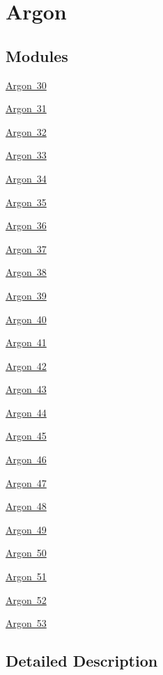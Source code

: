 \hypertarget{group___isotope_const-_argon}{}\section{Argon}
\label{group___isotope_const-_argon}
\subsection*{Modules}
\begin{DoxyCompactItemize}
\item 
\mbox{\hyperlink{group___isotope_const-_argon-_ar30}{Argon 30}}
\item 
\mbox{\hyperlink{group___isotope_const-_argon-_ar31}{Argon 31}}
\item 
\mbox{\hyperlink{group___isotope_const-_argon-_ar32}{Argon 32}}
\item 
\mbox{\hyperlink{group___isotope_const-_argon-_ar33}{Argon 33}}
\item 
\mbox{\hyperlink{group___isotope_const-_argon-_ar34}{Argon 34}}
\item 
\mbox{\hyperlink{group___isotope_const-_argon-_ar35}{Argon 35}}
\item 
\mbox{\hyperlink{group___isotope_const-_argon-_ar36}{Argon 36}}
\item 
\mbox{\hyperlink{group___isotope_const-_argon-_ar37}{Argon 37}}
\item 
\mbox{\hyperlink{group___isotope_const-_argon-_ar38}{Argon 38}}
\item 
\mbox{\hyperlink{group___isotope_const-_argon-_ar39}{Argon 39}}
\item 
\mbox{\hyperlink{group___isotope_const-_argon-_ar40}{Argon 40}}
\item 
\mbox{\hyperlink{group___isotope_const-_argon-_ar41}{Argon 41}}
\item 
\mbox{\hyperlink{group___isotope_const-_argon-_ar42}{Argon 42}}
\item 
\mbox{\hyperlink{group___isotope_const-_argon-_ar43}{Argon 43}}
\item 
\mbox{\hyperlink{group___isotope_const-_argon-_ar44}{Argon 44}}
\item 
\mbox{\hyperlink{group___isotope_const-_argon-_ar45}{Argon 45}}
\item 
\mbox{\hyperlink{group___isotope_const-_argon-_ar46}{Argon 46}}
\item 
\mbox{\hyperlink{group___isotope_const-_argon-_ar47}{Argon 47}}
\item 
\mbox{\hyperlink{group___isotope_const-_argon-_ar48}{Argon 48}}
\item 
\mbox{\hyperlink{group___isotope_const-_argon-_ar49}{Argon 49}}
\item 
\mbox{\hyperlink{group___isotope_const-_argon-_ar50}{Argon 50}}
\item 
\mbox{\hyperlink{group___isotope_const-_argon-_ar51}{Argon 51}}
\item 
\mbox{\hyperlink{group___isotope_const-_argon-_ar52}{Argon 52}}
\item 
\mbox{\hyperlink{group___isotope_const-_argon-_ar53}{Argon 53}}
\end{DoxyCompactItemize}


\subsection{Detailed Description}
